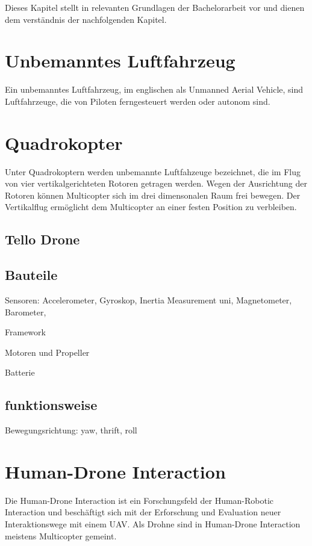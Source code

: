
Dieses Kapitel stellt in relevanten Grundlagen der Bachelorarbeit vor und dienen dem verständnis der nachfolgenden Kapitel. 

\section{Unbemanntes Luftfahrzeug}
Ein unbemanntes Luftfahrzeug, im englischen als Unmanned Aerial Vehicle, sind Luftfahrzeuge, die von Piloten ferngesteuert werden oder autonom sind.

\section{Quadrokopter}
Unter Quadrokoptern werden unbemannte Luftfahzeuge bezeichnet, die im Flug von vier vertikalgerichteten Rotoren getragen werden. Wegen der Ausrichtung der Rotoren können Multicopter sich im drei dimensonalen Raum frei bewegen. Der Vertikalflug ermöglicht dem Multicopter an einer festen Position zu verbleiben.

\subsection{Tello Drone}

\subsection{Bauteile}

Sensoren: Accelerometer, Gyroskop, Inertia Measurement uni, Magnetometer, Barometer,

Framework

Motoren und Propeller

Batterie

\subsection{funktionsweise}

Bewegungsrichtung: yaw, thrift, roll

\section{Human-Drone Interaction}
Die Human-Drone Interaction ist ein Forschungsfeld der Human-Robotic Interaction \cite{Tezza2019TheStaOfArtHumDro}
und beschäftigt sich mit der Erforschung und Evaluation neuer Interaktionswege mit einem UAV. Als Drohne sind in Human-Drone Interaction meistens Multicopter gemeint.

